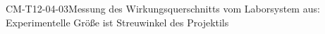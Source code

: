 
\begin{CONC}{CM-T12-04-03}{Messung des Wirkungsquerschnitts vom Laborsystem aus: Experimentelle Größe ist Streuwinkel des Projektils}
\end{CONC}
